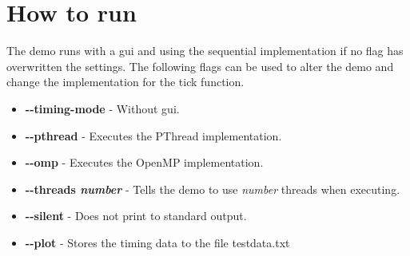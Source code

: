 \documentclass[a4paper,11pt]{article}
\begin{document}
\section{How to run}
The demo runs with a gui and using the sequential implementation
if no flag has overwritten the settings. The following flags can be
used to alter the demo and change the implementation for the tick
function.
\begin{itemize}[label=,leftmargin=0pt]
\item \textbf{-\--timing-mode} - Without gui.
\item \textbf{-\--pthread} - Executes the PThread implementation.
\item \textbf{-\--omp} - Executes the OpenMP implementation.
\item \textbf{-\--threads \textit{number}} - Tells the demo to use
  \textit{number} threads when executing.
\item \textbf{-\--silent} - Does not print to standard output.
\item \textbf{-\--plot} - Stores the timing data to the file testdata.txt
\end{itemize}
\end{document}
